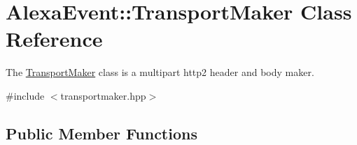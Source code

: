 \hypertarget{classAlexaEvent_1_1TransportMaker}{}\section{Alexa\+Event\+:\+:Transport\+Maker Class Reference}
\label{classAlexaEvent_1_1TransportMaker}


The \hyperlink{classAlexaEvent_1_1TransportMaker}{Transport\+Maker} class is a multipart http2 header and body maker.  




{\ttfamily \#include $<$transportmaker.\+hpp$>$}

\subsection*{Public Member Functions}
